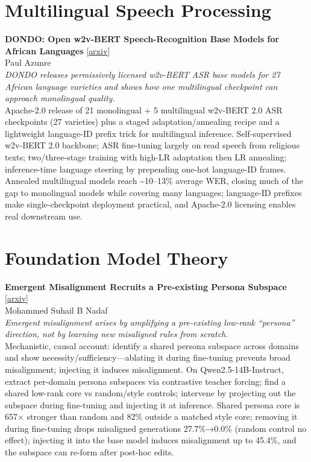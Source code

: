 \documentclass[12pt,letterpaper]{article}
\begin{document}
\medskip


\section*{Multilingual Speech Processing}

{\small\textbf{DONDO: Open w2v-BERT Speech-Recognition Base Models for African Languages}} {\scriptsize[\href{https://arxiv.org/abs/2607.21540}{arxiv}]}\\
{\scriptsize Paul Azunre}\\

{\small\textit{DONDO releases permissively licensed w2v-BERT ASR base models for 27 African language varieties and shows how one multilingual checkpoint can approach monolingual quality.}}\\[1pt]
{\footnotesize Apache-2.0 release of 21 monolingual + 5 multilingual w2v-BERT 2.0 ASR checkpoints (27 varieties) plus a staged adaptation/annealing recipe and a lightweight language-ID prefix trick for multilingual inference. Self-supervised w2v-BERT 2.0 backbone; ASR fine-tuning largely on read speech from religious texts; two/three-stage training with high-LR adaptation then LR annealing; inference-time language steering by prepending one-hot language-ID frames. Annealed multilingual models reach \textasciitilde{}10--13\% average WER, closing much of the gap to monolingual models while covering many languages; language-ID prefixes make single-checkpoint deployment practical, and Apache-2.0 licensing enables real downstream use.}

\medskip


\section*{Foundation Model Theory}

{\small\textbf{Emergent Misalignment Recruits a Pre-existing Persona Subspace}} {\scriptsize[\href{https://arxiv.org/abs/2607.21356}{arxiv}]}\\
{\scriptsize Mohammed Suhail B Nadaf}\\

{\small\textit{Emergent misalignment arises by amplifying a pre-existing low-rank ``persona'' direction, not by learning new misaligned rules from scratch.}}\\[1pt]
{\footnotesize Mechanistic, causal account: identify a shared persona subspace across domains and show necessity/sufficiency---ablating it during fine-tuning prevents broad misalignment; injecting it induces misalignment. On Qwen2.5-14B-Instruct, extract per-domain persona subspaces via contrastive teacher forcing; find a shared low-rank core vs random/style controls; intervene by projecting out the subspace during fine-tuning and injecting it at inference. Shared persona core is 657× stronger than random and 82\% outside a matched style core; removing it during fine-tuning drops misaligned generations 27.7\%→0.0\% (random control no effect); injecting it into the base model induces misalignment up to 45.4\%, and the subspace can re-form after post-hoc edits.}
\end{document}
